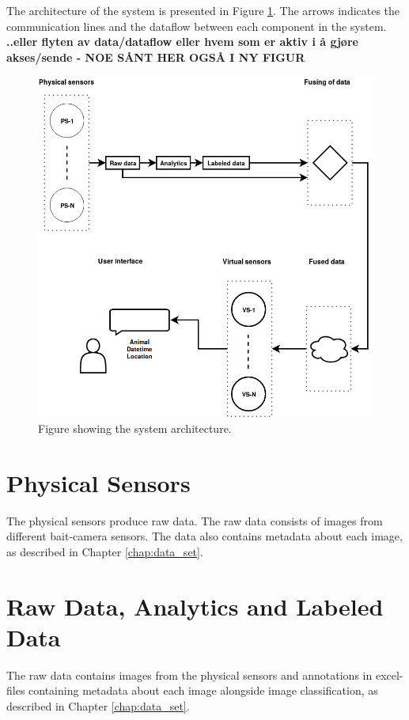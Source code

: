 \documentclass[USenglish]{uit-thesis}
\begin{document}
The architecture of the system is presented in Figure \ref{fig:architecture1}. The arrows indicates the communication lines and the dataflow between each component in the system. \textbf{..eller flyten av data/dataflow eller hvem som er aktiv i å gjøre akses/sende - NOE SÅNT HER OGSÅ I NY FIGUR}


\begin{figure}
\centering
\includegraphics[width=\textwidth]{Architecture_otto5.png}
\caption{Figure showing the system architecture.}
\label{fig:architecture1}
\end{figure}


\section{Physical Sensors}
The physical sensors produce raw data. The raw data consists of images from different bait-camera sensors.
The data also contains metadata about each image, as described in Chapter \ref{chap:data_set}. 


\section{Raw Data, Analytics and Labeled Data}
The raw data contains images from the physical sensors and annotations in excel-files containing metadata about each image alongside image classification, as described in Chapter \ref{chap:data_set}.
\end{document}
